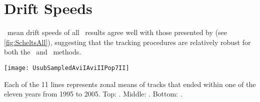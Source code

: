 



\section{Drift Speeds}

~mean drift speeds of all \AVI~results agree well with those presented by \citet{Chelton2011} (see \cref{fig:ScheltsAll}), suggesting that the tracking procedures are relatively robust for both the \MI~and \MII~methods.

\begin{marginfigure}
	\label{fig:UsubSampledAviIAviIIPop7II}
	\texttt{[image: UsubSampledAviIAviIIPop7II]}
	\caption{Each of the 11 lines represents zonal means of tracks that ended within one of the eleven years from 1995 to 2005. Top: \aviI. Middle: \aviII. Bottom:  \popSevenII.}
\end{marginfigure}


